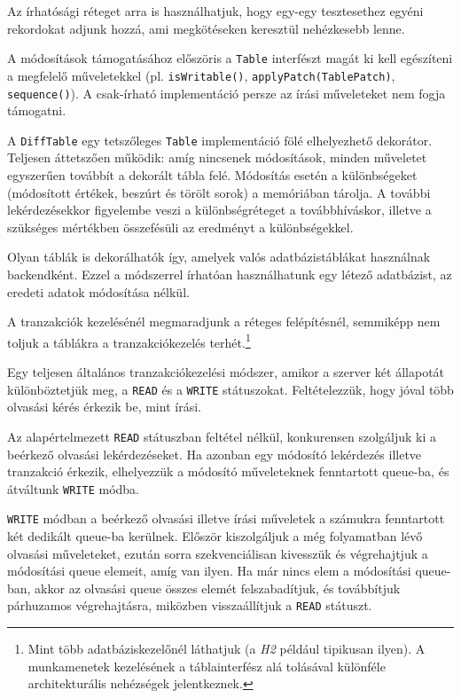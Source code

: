 \documentclass[
    parspace,
    noindent,
    nohyp,
]{elteiktdk}[2023/04/10]
\begin{document}
Az írhatósági réteget arra is használhatjuk,
hogy egy-egy tesztesethez egyéni rekordokat adjunk hozzá,
ami megkötéseken keresztül nehézkesebb lenne.

A módosítások támogatásához előszöris a \texttt{Table} interfészt magát
ki kell egészíteni a megfelelő műveletekkel
(pl. \texttt{isWritable()}, \texttt{applyPatch(TablePatch)}, \texttt{sequence()}).
A csak-írható implementáció persze az írási műveleteket nem fogja támogatni.

A \texttt{DiffTable} egy tetszőleges \texttt{Table} implementáció fölé elhelyezhető dekorátor.
Teljesen áttetszően működik: amíg nincsenek módosítások,
minden műveletet egyszerűen továbbít a dekorált tábla felé.
Módosítás esetén a különbségeket (módosított értékek, beszúrt és törölt sorok) a memóriában tárolja.
A további lekérdezésekkor figyelembe veszi a különbségréteget a továbbhíváskor,
illetve a szükséges mértékben összefésüli az eredményt a különbségekkel.

Olyan táblák is dekorálhatók így, amelyek valós adatbázistáblákat használnak backendként.
Ezzel a módszerrel írhatóan használhatunk egy létező adatbázist,
az eredeti adatok módosítása nélkül.

A tranzakciók kezelésénél megmaradjunk a réteges felépítésnél,
semmiképp nem toljuk a táblákra a tranzakciókezelés terhét.\footnote{
    Mint több adatbáziskezelőnél láthatjuk (a \textit{H2} például tipikusan ilyen).
    A munkamenetek kezelésének a táblainterfész alá tolásával
    különféle architekturális nehézségek jelentkeznek.
}

Egy teljesen általános tranzakciókezelési módszer,
amikor a szerver két állapotát különböztetjük meg,
a \texttt{READ} és a \texttt{WRITE} státuszokat.
Feltételezzük, hogy jóval több olvasási kérés érkezik be, mint írási.

Az alapértelmezett \texttt{READ} státuszban feltétel nélkül,
konkurensen szolgáljuk ki a beérkező olvasási lekérdezéseket.
Ha azonban egy módosító lekérdezés illetve tranzakció érkezik,
elhelyezzük a módosító műveleteknek fenntartott queue-ba,
és átváltunk \texttt{WRITE} módba.

\texttt{WRITE} módban a beérkező olvasási illetve írási műveletek
a számukra fenntartott két dedikált queue-ba kerülnek.
Először kiszolgáljuk a még folyamatban lévő olvasási műveleteket,
ezután sorra szekvenciálisan kivesszük és végrehajtjuk a módosítási queue elemeit, amíg van ilyen.
Ha már nincs elem a módosítási queue-ban,
akkor az olvasási queue összes elemét felszabadítjuk, és továbbítjuk párhuzamos végrehajtásra,
miközben visszaállítjuk a \texttt{READ} státuszt.
\end{document}
